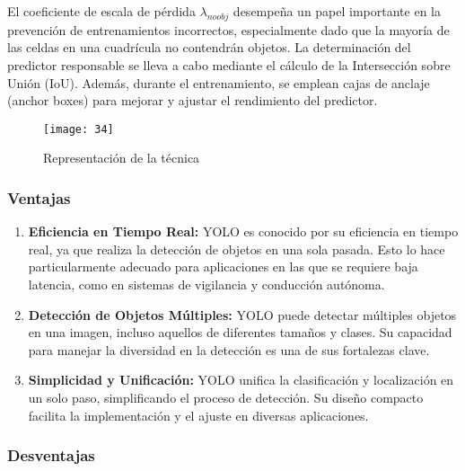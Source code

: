 	El coeficiente de escala de pérdida $\lambda_{noobj}$ desempeña un papel importante en la prevención de entrenamientos incorrectos, especialmente dado que la mayoría de las celdas en una cuadrícula no contendrán objetos. La determinación del predictor responsable se lleva a cabo mediante el cálculo de la Intersección sobre Unión (IoU). Además, durante el entrenamiento, se emplean cajas de anclaje (anchor boxes) para mejorar y ajustar el rendimiento del predictor.

	\begin{figure}[ht]
		\centering
		\texttt{[image: 34]}
		\caption{Representación de la técnica}
	\end{figure}
	
	\subsubsection{Ventajas}
	
	\begin{enumerate}
		\item \textbf{Eficiencia en Tiempo Real:} YOLO es conocido por su eficiencia en tiempo real, ya que realiza la detección de objetos en una sola pasada. Esto lo hace particularmente adecuado para aplicaciones en las que se requiere baja latencia, como en sistemas de vigilancia y conducción autónoma.
    
    	\item \textbf{Detección de Objetos Múltiples:} YOLO puede detectar múltiples objetos en una imagen, incluso aquellos de diferentes tamaños y clases. Su capacidad para manejar la diversidad en la detección es una de sus fortalezas clave.
    
   		\item \textbf{Sim­plicidad y Unificación:} YOLO unifica la clasificación y localización en un solo paso, simplificando el proceso de detección. Su diseño compacto facilita la implementación y el ajuste en diversas aplicaciones.
    
	\end{enumerate}
	
	\subsubsection{Desventajas}
	
